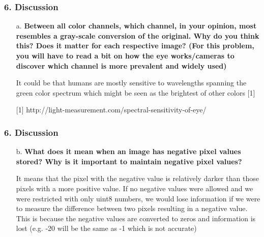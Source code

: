 	\begin{frame}[t]
		\frametitle{6. Discussion}
		
		\begin{normalsize}
			\begin{itemize}
				\setlength\itemsep{1em}
				
				\item[a.] \textbf{Between all color channels, which channel, in your opinion, most resembles a gray-scale conversion of the original.  Why do you think this?  Does it matter for each respective image? (For this problem, you will have to read a bit on how the eye works/cameras to discover which channel is more prevalent and widely used)}
				
				\item[] It could be that humans are mostly sensitive to wavelengths spanning the green color spectrum which might be seen as the brightest of other colors [1]   

				\item[][1] http://light-measurement.com/spectral-sensitivity-of-eye/ %
			\end{itemize}
		\end{normalsize}
		
	\end{frame}

	\begin{frame}[t]
		\frametitle{6. Discussion}
		
		\begin{normalsize}
			\begin{itemize}
				\setlength\itemsep{1em}
				
				\item[b.] \textbf{What does it mean when an image has negative pixel values stored?  Why is it important to maintain negative pixel values?}
				
				\item[] It means that the pixel with the negative value is relatively darker than those pixels with a more positive value. If no negative values were allowed and we were restricted with only uint8 numbers, we would lose information if we were to measure the difference between two pixels resulting in a negative value. This is because the negative values are converted to zeros and information is lost (e.g. -20 will be the same as -1 which is not accurate)
				
			\end{itemize}
		\end{normalsize}
		
	\end{frame}

